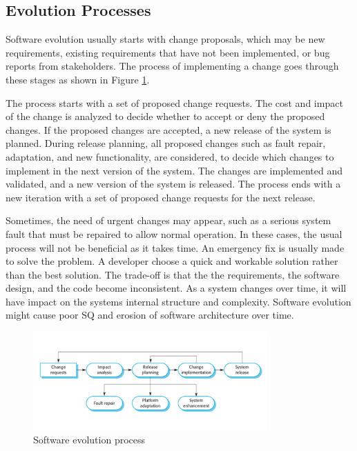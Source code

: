 \subsection{Evolution Processes}
Software evolution usually starts with change proposals, which may be new requirements, existing requirements that have not been implemented, or bug reports from stakeholders. The process of implementing a change goes through these stages\cite{Sommerville:2011:SE} as shown in Figure \ref{fig:seProcess}.

The process starts with a set of proposed change requests. The cost and impact of the change is analyzed to decide whether to accept or deny the proposed changes. If the proposed changes are accepted, a new release of the system is planned. During release planning, all proposed changes such as fault repair, adaptation, and new functionality, are considered, to decide which changes to implement in the next version of the system. The changes are implemented and validated, and a new version of the system is released. The process ends with a new iteration with a set of proposed change requests for the next release. 

Sometimes, the need of urgent changes may appear, such as a serious system fault that must be repaired to allow normal operation. In these cases, the usual process will not be beneficial as it takes time. An emergency fix is usually made to solve the problem. A developer choose a quick and workable solution rather than the best solution. The trade-off is that the the requirements, the software design, and the code become inconsistent. As a system changes over time, it will have impact on the systems internal structure and complexity. Software evolution might cause poor SQ and erosion of software architecture over time\cite{Bass:2012:SAP:2392670}.

\begin{figure}[h!]
	\centering
	\includegraphics[width=0.8\textwidth]{images/SEprocess.png}
	\caption{Software evolution process}
	\label{fig:seProcess}
\end{figure}


